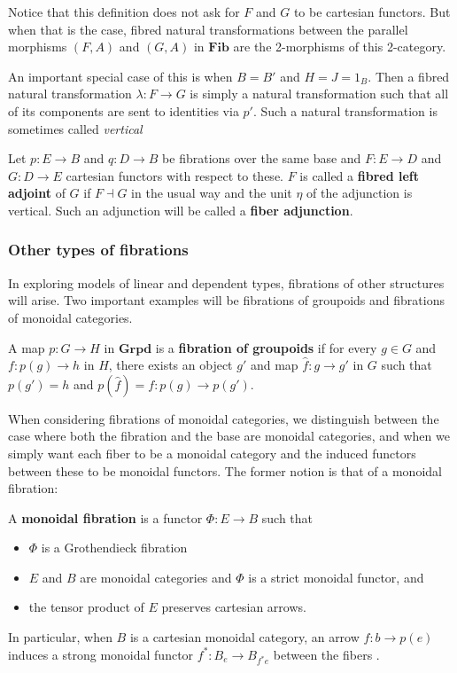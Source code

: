 Notice that this definition does not ask for $F$ and $G$ to be cartesian functors. But when that is the case, fibred natural transformations between the parallel morphisms $(F, A)$ and $(G, A)$ in $\mathbf{Fib}$ are the 2-morphisms of this 2-category.

An important special case of this is when $B = B'$ and $H = J = 1_B$. Then a fibred natural transformation $\lambda : F \to G$ is simply a natural transformation such that all of its components are sent to identities via $p'$. Such a natural transformation is sometimes called \textit{vertical}

\begin{defn}Let $p : E \to B$ and $q : D \to B$ be fibrations over the same base and $F : E \to D$ and $G : D \to E$ cartesian functors with respect to these. $F$ is called a \textbf{fibred left adjoint} of $G$ if $F \dashv G$ in the usual way and the unit $\eta$ of the adjunction is vertical. Such an adjunction will be called a \textbf{fiber adjunction}.
\end{defn}

\subsubsection{Other types of fibrations}
In exploring models of linear and dependent types, fibrations of other structures will arise. Two important examples will be fibrations of groupoids and fibrations of monoidal categories.
\begin{defn}
A map $p : G \to H$ in $\textbf{Grpd}$ is a \textbf{fibration of groupoids} if for every $g \in G$
and $f : p(g) \to h$ in $H$, there exists an object $g'$ and map $\hat f : g \to g'$ in $G$ such that $p(g') = h$ and $p(\hat f) = f : p(g) \to p(g')$.
\end{defn}
When considering fibrations of monoidal categories, we distinguish between the case where both the fibration and the base are monoidal categories, and when we simply want each fiber to be a monoidal category and the induced functors between these to be monoidal functors. The former notion is that of a monoidal fibration:
\begin{defn}
A \textbf{monoidal fibration} is a functor $\Phi\colon E\to B$ such that
\begin{itemize}
\item $\Phi$ is a Grothendieck fibration
\item $E$ and $B$ are monoidal categories and $\Phi$ is a strict monoidal functor, and
\item the tensor product of $E$ preserves cartesian arrows.
\end{itemize}
\end{defn}
In particular, when $B$ is a cartesian monoidal category, an arrow $f : b \to p(e)$ induces a strong monoidal functor $f^* : B_e \to B_{f^*e}$ between the fibers \cite{shulmanmonoidal}.


